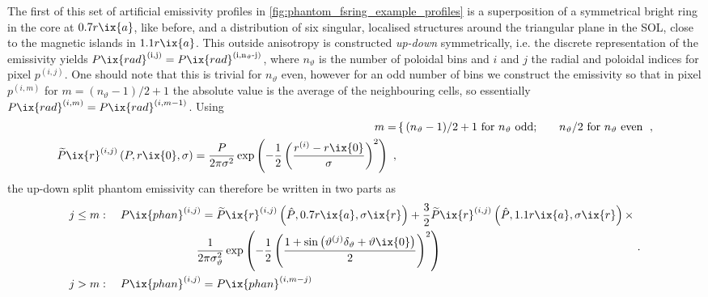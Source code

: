 %
            The first of this set of artificial emissivity profiles in \cref{fig:phantom_fsring_example_profiles} is a superposition of a symmetrical bright ring in the core at $0.7r\ix{a}$, like before, and a distribution of six singular, localised structures around the triangular plane in the SOL, close to the magnetic islands in $1.1r\ix{a}$. This outside anisotropy is constructed \textit{up-down} symmetrically, i.e. the discrete representation of the emissivity yields $P\ix{rad}^{\left(\text{i,j}\right)}=P\ix{rad}^{\left(\text{i,n$_{\vartheta}$-j}\right)}$, where $n_{\vartheta}$ is the number of poloidal bins and $i$ and $j$ the radial and poloidal indices for pixel $p^{\left(i,j\right)}$. One should note that this is trivial for $n_{\vartheta}$ even, however for an odd number of bins we construct the emissivity so that in pixel $p^{\left(i,m\right)}$ for $m=(n_{\vartheta}-1)/2+1$ the absolute value is the average of the neighbouring cells, so essentially $P\ix{rad}^{\left(i,m\right)}=P\ix{rad}^{\left(i,m-1\right)}$. Using%
%
            \begin{align}%
                m=&\left\{\,(n_{\vartheta}-1)/2+1\,\,\text{for }n_{\vartheta}\text{ odd;}\qquad n_{\vartheta}/2\,\,\text{for }n_{\vartheta}\text{ even}\right.\,\,,\nonumber\\%
                \widetilde{P}\ix{r}^{\left(i,j\right)}\left(P,r\ix{0},\sigma\right)=\frac{P}{2\pi\sigma^{2}}\exp\left(-\frac{1}{2}\left(\frac{r^{\left(i\right)}-r\ix{0}}{\sigma}\right)^{2}\right)\,\,,\nonumber%
            \end{align}%
%
            the up-down split phantom emissivity can therefore be written in two parts as%
%
            \begin{align}
                \begin{split}\label{eq:prad_anisym}%
                    j\leq m&:\quad P\ix{phan}^{\left(i,j\right)}=%
                        \widetilde{P}\ix{r}^{\left(i,j\right)}\left(\hat{P},0.7r\ix{a},\sigma\ix{r}\right)+\frac{3}{2}\widetilde{P}\ix{r}^{\left(i,j\right)}\left(\hat{P},1.1r\ix{a},\sigma\ix{r}\right)\times\\%
                        &\hspace*{3cm}\frac{1}{2\pi\sigma_{\vartheta}^{2}}\exp\left(-\frac{1}{2}\left(\frac{1+\sin\left(\vartheta^{\left(j\right)}\delta_{\vartheta}+\vartheta\ix{0}\right)}{2}\right)^{2}\right)\\%
                    j>m&:\quad P\ix{phan}^{\left(i,j\right)}=P\ix{phan}^{\left(i,m-j\right)}%
                \end{split}\,\,.%
            \end{align}%
